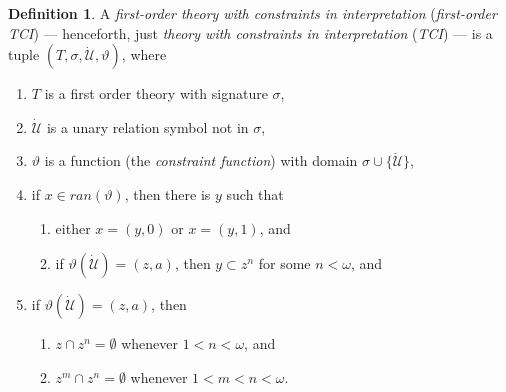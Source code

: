\documentclass[12pt, twoside]{memoir}
\numberwithin{equation}{section}
\theoremstyle{definition}
\newtheorem{defi}[thm]{Definition}
\theoremstyle{remark}
\theoremstyle{definition}
\theoremstyle{definition}
\theoremstyle{definition}
\theoremstyle{remark}
\begin{document}
\begin{defi}
A \emph{first-order theory with constraints in interpretation} (\emph{first-order TCI}) --- henceforth, just \emph{theory with constraints in interpretation} (\emph{TCI}) --- is a tuple $(T, \sigma, \dot{\mathcal{U}}, \vartheta)$, where
\begin{enumerate}[label=(\alph*)]
    \item $T$ is a first order theory with signature $\sigma$,
    \item $\dot{\mathcal{U}}$ is a unary relation symbol not in $\sigma$,
    \item $\vartheta$ is a function (the \emph{constraint function}) with domain $\sigma \cup \{\dot{\mathcal{U}}\}$, 
    \item if $x \in ran(\vartheta)$, then there is $y$ such that 
    \begin{enumerate}[label=(\roman*)]
        \item either $x = (y, 0)$ or $x = (y, 1)$, and
        \item if $\vartheta(\dot{\mathcal{U}}) = (z, a)$, then $y \subset z^n$ for some $n < \omega$, and
    \end{enumerate}
    \item if $\vartheta(\dot{\mathcal{U}}) = (z, a)$, then 
    \begin{enumerate}[label=(\roman*)]
        \item $z \cap z^n = \emptyset$ whenever $1 < n < \omega$, and
        \item $z^m \cap z^n = \emptyset$ whenever $1 < m < n < \omega$.
    \end{enumerate}
\end{enumerate}
\end{defi}
\end{document}
